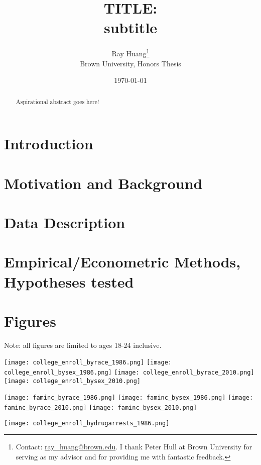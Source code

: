 \documentclass{article}
\title{TITLE:\texorpdfstring{\\}{} subtitle}
\author{Ray Huang\thanks{Contact:
    \href{mailto:ray_huang@brown.edu}{ray\_huang@brown.edu}.
     I thank Peter Hull at Brown University for serving as my advisor and for providing me with fantastic feedback.}
     \\Brown University, Honors Thesis}
\date{\today}
\begin{document}
\maketitle

\begin{abstract}
\noindent Aspirational abstract goes here!
\end{abstract}

\clearpage

\section*{Introduction}

\section*{Motivation and Background}

\section*{Data Description}

\section*{Empirical/Econometric Methods, Hypotheses tested}

\section*{Figures}

Note: all figures are limited to ages 18-24 inclusive.

\begin{center}
\texttt{[image: college\_enroll\_byrace\_1986.png]}
\texttt{[image: college\_enroll\_bysex\_1986.png]}
\texttt{[image: college\_enroll\_byrace\_2010.png]}
\texttt{[image: college\_enroll\_bysex\_2010.png]}
\end{center}

\begin{center}
  \texttt{[image: faminc\_byrace\_1986.png]}
  \texttt{[image: faminc\_bysex\_1986.png]}
  \texttt{[image: faminc\_byrace\_2010.png]}
  \texttt{[image: faminc\_bysex\_2010.png]}
\end{center}

\texttt{[image: college\_enroll\_bydrugarrests\_1986.png]}
\end{document}
